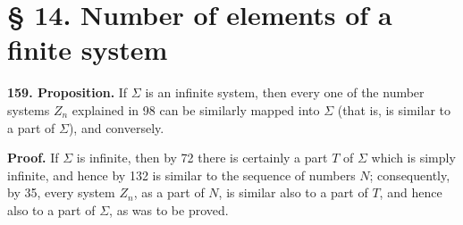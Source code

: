 \documentclass[11pt]{article}
\begin{document}
\section*{§ 14. Number of elements of a finite system}

\noindent\textbf{159. Proposition.} If $\Sigma$ is an infinite system, then every one of the number systems $Z_n$ explained in 98 can be similarly mapped into $\Sigma$ (that is, is similar to a part of $\Sigma$), and conversely.

\noindent\textbf{Proof.} If $\Sigma$ is infinite, then by 72 there is certainly a part $T$ of $\Sigma$ which is simply infinite, and hence by 132 is similar to the sequence of numbers $N$; consequently, by 35, every system $Z_n$, as a part of $N$, is similar also to a part of $T$, and hence also to a part of $\Sigma$, as was to be proved.
\end{document}
